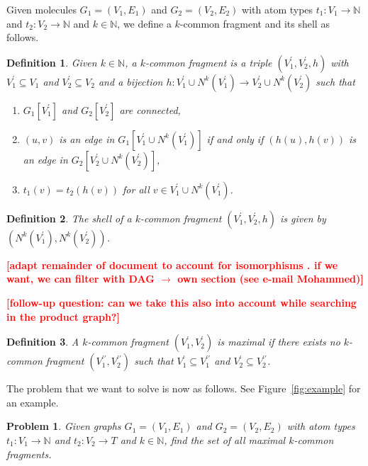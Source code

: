 \documentclass[11pt]{article}
\newcommand{\todo}[1]{\xspace{\bfseries\sffamily\textcolor{red}{[#1]}}\xspace}
\newtheorem{problem}{Problem}[section]
\newtheorem{definition}{Definition}[section]
\begin{document}
Given molecules $G_1 = (V_1, E_1)$ and $G_2 = (V_2, E_2)$ with atom types $t_1 :
V_1 \rightarrow \mathbb{N}$ and $t_2 : V_2 \rightarrow \mathbb{N}$ and $k \in
\mathbb{N}$, we define a $k$-common fragment and its shell as follows.

\begin{definition}
Given $k \in \mathbb{N}$, a \emph{$k$-common fragment} is a triple $(V^\prime_1,
V^\prime_2,h)$ with $V^\prime_1 \subseteq V_1$ and $V^\prime_2 \subseteq V_2$ and a bijection $h : V^\prime_1 \cup N^k(V^\prime_1) \rightarrow V^\prime_2
\cup N^k(V^\prime_2)$ such that
\begin{enumerate}
  \item[(i)] $G_1[V^\prime_1]$ and $G_2[V^\prime_2]$ are connected,
  \item[(ii)] $(u,v)$ is an edge in $G_1[V^\prime_1 \cup N^k(V^\prime_1)]$ if and
    only if $(h(u),h(v))$ is an edge in ${G_2[V^\prime_2 \cup
    N^k(V^\prime_2)]}$,
  \item[(iii)] $t_1(v) = t_2(h(v))$ for all $v \in V^\prime_1 \cup
    N^k(V^\prime_1)$.
\end{enumerate}
\end{definition}

\begin{definition}
The \emph{shell} of a $k$-common fragment $(V^\prime_1, V^\prime_2, h)$ is given by
$(N^k(V^\prime_1), N^k(V^\prime_2))$.
\end{definition}

\todo{adapt remainder of document to account for isomorphisms . if we
  want, we can filter with DAG $\to$ own section (see e-mail Mohammed)}

\todo{follow-up question: can we take this also into account while
  searching in the product graph?}

\begin{definition}
A $k$-common fragment $(V^\prime_1,V^\prime_2)$ is \emph{maximal} if there
exists no $k$-common fragment $(V^{\prime\prime}_1,V^{\prime\prime}_2)$ such
that $V^\prime_1 \subseteq V^{\prime\prime}_1$ and $V^\prime_2 \subseteq
V^{\prime\prime}_2$.
\end{definition}

The problem that we want to solve is now as follows. See
Figure~\ref{fig:example} for an example.

\begin{problem}
Given graphs $G_1 = (V_1, E_1)$ and $G_2 = (V_2, E_2)$ with atom types $t_1 :
V_1 \rightarrow \mathbb{N}$ and $t_2 : V_2 \rightarrow T$ and $k \in
\mathbb{N}$, find the set of all maximal $k$-common fragments.
\end{problem}
\end{document}
